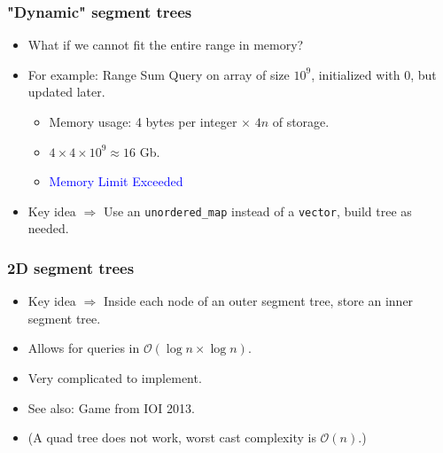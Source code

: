 \documentclass[12pt]{beamer}
\newcommand{\bigoh}{\mathcal{O}}
\begin{document}
\begin{frame}
    \frametitle{"Dynamic" segment trees}

    \begin{itemize}
        \item What if we cannot fit the entire range in memory?
        \item For example: Range Sum Query on array of size $10^9$, initialized with $0$, but updated later.
        \begin{itemize}
            \item Memory usage: 4 bytes per integer $\times$ $4n$ of storage.
            \item $4 \times 4 \times 10^9 \approx 16$ Gb.
            \item \textcolor{blue}{Memory Limit Exceeded}
        \end{itemize}
        \item Key idea $\Rightarrow$ Use an \lstinline{unordered_map} instead of a \lstinline{vector}, build tree as needed.
    \end{itemize}
\end{frame}

\begin{frame}
    \frametitle{2D segment trees}

    \begin{itemize}
        \item Key idea $\Rightarrow$ Inside each node of an outer segment tree, store an inner segment tree.
        \item Allows for queries in $\bigoh\left(\log n \times \log n\right)$.
        \item Very complicated to implement.
        \item See also: Game from IOI 2013.
        \item (A quad tree does not work, worst cast complexity is $\bigoh (n)$.)
    \end{itemize}
\end{frame}
\end{document}

